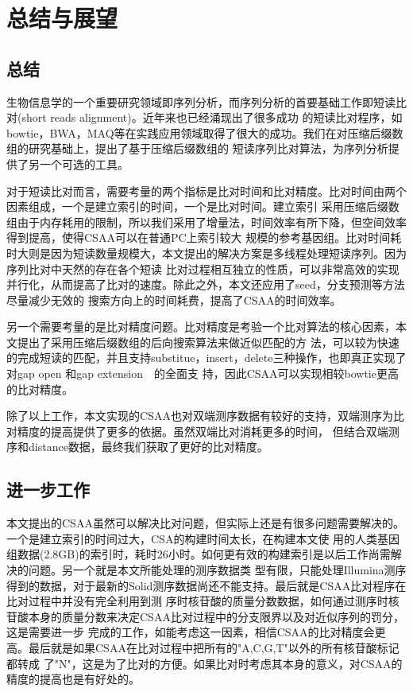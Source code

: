 \chapter{总结与展望}
\label{chap:con}

\section{总结}
生物信息学的一个重要研究领域即序列分析，而序列分析的首要基础工作即短读比对(short reads alignment)。近年来也已经涌现出了很多成功
的短读比对程序，如bowtie，BWA，MAQ等在实践应用领域取得了很大的成功。我们在对压缩后缀数组的研究基础上，提出了基于压缩后缀数组的
短读序列比对算法，为序列分析提供了另一个可选的工具。

对于短读比对而言，需要考量的两个指标是比对时间和比对精度。比对时间由两个因素组成，一个是建立索引的时间，一个是比对时间。建立索引
采用压缩后缀数组由于内存耗用的限制，所以我们采用了增量法，时间效率有所下降，但空间效率得到提高，使得CSAA可以在普通PC上索引较大
规模的参考基因组。比对时间耗时大则是因为短读数量规模大，本文提出的解决方案是多线程处理短读序列。因为序列比对中天然的存在各个短读
比对过程相互独立的性质，可以非常高效的实现并行化，从而提高了比对的速度。除此之外，本文还应用了seed，分支预测等方法尽量减少无效的
搜索方向上的时间耗费，提高了CSAA的时间效率。

另一个需要考量的是比对精度问题。比对精度是考验一个比对算法的核心因素，本文提出了采用压缩后缀数组的后向搜索算法来做近似匹配的方
法，可以较为快速的完成短读的匹配，并且支持substitue，insert，delete三种操作，也即真正实现了对gap open 和gap extension　的全面支
持，因此CSAA可以实现相较bowtie更高的比对精度。

除了以上工作，本文实现的CSAA也对双端测序数据有较好的支持，双端测序为比对精度的提高提供了更多的依据。虽然双端比对消耗更多的时间，
但结合双端测序和distance数据，最终我们获取了更好的比对精度。

\section{进一步工作}
本文提出的CSAA虽然可以解决比对问题，但实际上还是有很多问题需要解决的。一个是建立索引的时间过大，CSA的构建时间太长，在构建本文使
用的人类基因组数据(2.8GB)的索引时，耗时26小时。如何更有效的构建索引是以后工作尚需解决的问题。另一个就是本文所能处理的测序数据类
型有限，只能处理Illumina测序得到的数据，对于最新的Solid测序数据尚还不能支持。最后就是CSAA比对程序在比对过程中并没有完全利用到测
序时核苷酸的质量分数数据，如何通过测序时核苷酸本身的质量分数来决定CSAA比对过程中的分支限界以及对近似序列的罚分，这是需要进一步
完成的工作，如能考虑这一因素，相信CSAA的比对精度会更高。最后就是如果CSAA在比对过程中把所有的"A,C,G,T"以外的所有核苷酸标记都转成
了"N"，这是为了比对的方便。如果比对时考虑其本身的意义，对CSAA的精度的提高也是有好处的。
